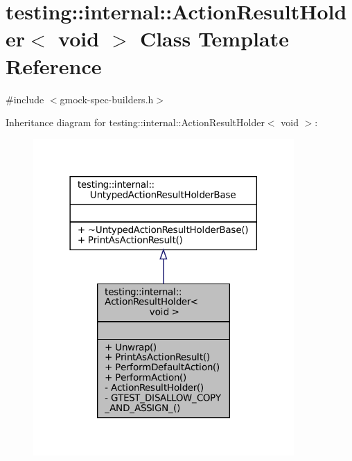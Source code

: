 \hypertarget{classtesting_1_1internal_1_1ActionResultHolder_3_01void_01_4}{}\section{testing\+:\+:internal\+:\+:Action\+Result\+Holder$<$ void $>$ Class Template Reference}
\label{classtesting_1_1internal_1_1ActionResultHolder_3_01void_01_4}


{\ttfamily \#include $<$gmock-\/spec-\/builders.\+h$>$}



Inheritance diagram for testing\+:\+:internal\+:\+:Action\+Result\+Holder$<$ void $>$\+:
\nopagebreak
\begin{figure}[H]
\begin{center}
\leavevmode
\includegraphics[width=282pt]{classtesting_1_1internal_1_1ActionResultHolder_3_01void_01_4__inherit__graph}
\end{center}
\end{figure}


